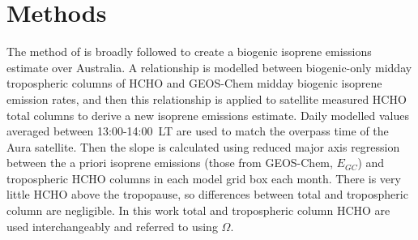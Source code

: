 \documentclass[acp, manuscript]{copernicus}
\newcommand{\textcite}{\citet}
\newcommand{\apri}{E_{GC}} %
\begin{document}

\section{Methods}
  \label{BioIsop:method}
  
  The method of \textcite{Palmer2001} is broadly followed to create a biogenic isoprene emissions estimate over Australia.
  A relationship is modelled between biogenic-only midday tropospheric columns of HCHO and GEOS-Chem midday biogenic isoprene emission rates, and then this relationship is applied to satellite measured HCHO total columns to derive a new isoprene emissions estimate.
  Daily modelled values averaged between 13:00-14:00~LT are used to match the overpass time of the Aura satellite.
  Then the slope is calculated using reduced major axis regression between the a priori isoprene emissions (those from GEOS-Chem, $\apri$) and tropospheric HCHO columns in each model grid box each month.
  There is very little HCHO above the tropopause, so differences between total and tropospheric column are negligible.
  In this work total and tropospheric column HCHO are used interchangeably and referred to using $\Omega$.
  
  
\end{document}
